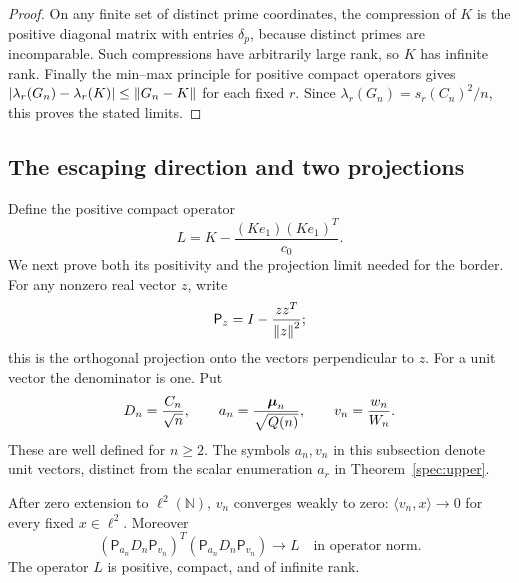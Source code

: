 \begin{proof}
On any finite set of distinct prime coordinates, the compression of $K$ is the positive diagonal matrix with entries $\delta_p$, because distinct primes are incomparable. Such compressions have arbitrarily large rank, so $K$ has infinite rank. Finally the min--max principle for positive compact operators gives
$|\lambda_r(G_n)-\lambda_r(K)|\le\left\lVert G_n-K\right\rVert$ for each fixed $r$. Since $\lambda_r(G_n)=s_r(C_n)^2/n$, this proves the stated limits.
\end{proof}

\subsection{The escaping direction and two projections}

Define the positive compact operator
\begin{equation}\label{spec:Ldefinition}
 L=K-\frac{(Ke_1)(Ke_1)^T}{c_0}.
\end{equation}
We next prove both its positivity and the projection limit needed for the border. For any nonzero real vector $z$, write
\[
 \mathsf P_z=I-\frac{zz^T}{\left\lVert z\right\rVert^2};
\]
this is the orthogonal projection onto the vectors perpendicular to $z$. For a unit vector the denominator is one. Put
\[
 D_n=\frac{C_n}{\sqrt n},\qquad
 a_n=\frac{\boldsymbol{\mu}_n}{\sqrt{Q(n)}},\qquad
 v_n=\frac{w_n}{W_n}.
\]
These are well defined for $n\ge2$. The symbols $a_n,v_n$ in this subsection denote unit vectors, distinct from the scalar enumeration $a_r$ in Theorem~\ref{spec:upper}.

\begin{lemma}\label{spec:escape}
After zero extension to $\ell^2(\mathbb N)$, $v_n$ converges weakly to zero: $\langle v_n,x\rangle\to0$ for every fixed $x\in\ell^2$. Moreover
\begin{equation}\label{spec:projectedlimit}
 (\mathsf P_{a_n}D_n\mathsf P_{v_n})^T
 (\mathsf P_{a_n}D_n\mathsf P_{v_n})\longrightarrow L
 \quad\text{in operator norm}.
\end{equation}
The operator $L$ is positive, compact, and of infinite rank.
\end{lemma}

